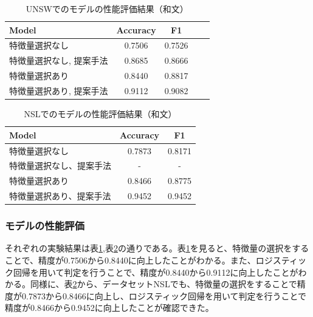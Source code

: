 \documentclass{css}
\begin{document}
\begin{table}[tb]
    \caption{UNSWでのモデルの性能評価結果（和文）}
    \centering
    \footnotesize
    \begin{tabular}{lcccc}
        \hline\hline
        Model & Accuracy & F1 \\
        \hline
        特徴量選択なし & 0.7506 & 0.7526 \\
        特徴量選択なし, 提案手法 & 0.8685 & 0.8666 \\
        特徴量選択あり & 0.8440 & 0.8817 \\
        特徴量選択あり, 提案手法 & 0.9112 & 0.9082 \\
        \hline
    \end{tabular}
    \label{tab:model_performance_UNSW}
\end{table}

\begin{table}[tb]
    \caption{NSLでのモデルの性能評価結果（和文）}
    \centering
    \footnotesize
    \begin{tabular}{lcc}
        \hline\hline
        Model & Accuracy & F1 \\
        \hline
        特徴量選択なし & 0.7873 & 0.8171 \\
        特徴量選択なし、提案手法 & - & -\\ 
        特徴量選択あり & 0.8466 & 0.8775 \\
        特徴量選択あり、提案手法 & 0.9452 & 0.9452 \\
        \hline
    \end{tabular}
    \label{tab:model_performance_NSL}
\end{table}

\subsubsection{モデルの性能評価}
それぞれの実験結果は表\ref{tab:model_performance_UNSW},表\ref{tab:model_performance_NSL}の通りである。表\ref{tab:model_performance_UNSW}を見ると、特徴量の選択をすることで、精度が0.7506から0.8440に向上したことがわかる。また、ロジスティック回帰を用いて判定を行うことで、精度が0.8440から0.9112に向上したことがわかる。同様に、表\ref{tab:model_performance_NSL}から、データセットNSLでも、特徴量の選択をすることで精度が0.7873から0.8466に向上し、ロジスティック回帰を用いて判定を行うことで精度が0.8466から0.9452に向上したことが確認できた。
\end{document}
